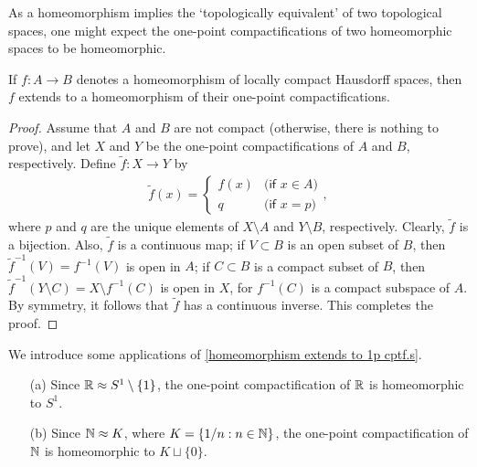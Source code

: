 As a homeomorphism implies the `topologically equivalent' of two topological spaces, one might expect the one-point compactifications of two homeomorphic spaces to be homeomorphic.
\begin{thm}\label{homeomorphism extends to 1p cptf.s}
    If $f: A\rightarrow B$ denotes a homeomorphism of locally compact Hausdorff spaces, then $f$ extends to a homeomorphism of their one-point compactifications.
\end{thm}
\begin{proof}
    Assume that $A$ and $B$ are not compact (otherwise, there is nothing to prove), and let $X$ and $Y$ be the one-point compactifications of $A$ and $B$, respectively.
    Define $\widetilde{f}: X\rightarrow Y$ by
    \begin{align*}
        \widetilde{f}(x)=\left\{\begin{array}{cc}
            f(x)    &   \textsf{(if $x\in A$)}\\
            q       &   \textsf{(if $x=p$)}
        \end{array}\right.,
    \end{align*}
    where $p$ and $q$ are the unique elements of $X\setminus A$ and $Y\setminus B$, respectively.
    Clearly, $\widetilde{f}$ is a bijection.
    Also, $\widetilde{f}$ is a continuous map; if $V\subset B$ is an open subset of $B$, then $\widetilde{f}^{-1}(V)=f^{-1}(V)$ is open in $A$; if $C\subset B$ is a compact subset of $B$, then $\widetilde{f}^{-1}(Y\setminus C)=X\setminus f^{-1}(C)$ is open in $X$, for $f^{-1}(C)$ is a compact subspace of $A$.
    By symmetry, it follows that $\widetilde{f}$ has a continuous inverse.
    This completes the proof.
\end{proof}
\begin{exmp}
    We introduce some applications of \cref{homeomorphism extends to 1p cptf.s}.
    \begin{enumerate}
        \item[(a)]
        {
            Since ${\mathbb{R}}\approx S^1\setminus\{1\}$, the one-point compactification of ${\mathbb{R}}$ is homeomorphic to $S^1$.
        }
        \item[(b)]
        {
            Since ${\mathbb{N}}\approx K$, where $K=\left\{1/n: n\in{\mathbb{N}}\right\}$, the one-point compactification of ${\mathbb{N}}$ is homeomorphic to $K\sqcup\{0\}$.
        }
    \end{enumerate}
\end{exmp}